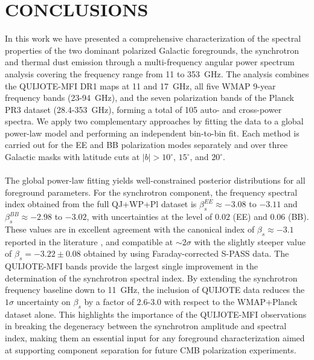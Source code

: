 \section{CONCLUSIONS}
\label{sec:conclusions}

In this work we have presented a comprehensive characterization of the spectral properties of the two dominant polarized Galactic foregrounds, the synchrotron and thermal dust emission through a multi-frequency angular power spectrum analysis covering the frequency range from 11 to 353~GHz. The analysis combines the QUIJOTE-MFI DR1 maps at 11 and 17~GHz, all five WMAP 9-year frequency bands (23-94~GHz), and the seven polarization bands of the Planck PR3 dataset (28.4-353~GHz), forming a total of 105 auto- and cross-power spectra. We apply two complementary approaches by fitting the data to a global power-law model and performing an independent bin-to-bin fit. Each method is carried out for the EE and BB polarization modes separately and over three Galactic masks with latitude cuts at $|b| > 10^\circ$, $15^\circ$, and $20^\circ$.

\paragraph{}

The global power-law fitting yields well-constrained posterior distributions for all foreground parameters. For the synchrotron component, the frequency spectral index obtained from the full QJ+WP+Pl dataset is $\beta_s^{EE} \approx -3.08$ to $-3.11$ and $\beta_s^{BB} \approx -2.98$ to $-3.02$, with uncertainties at the level of $0.02$ (EE) and $0.06$ (BB). These values are in excellent agreement with the canonical index of $\beta_s \approx -3.1$ reported in the literature \citep{Fuskeland_2014, Martire_2022}, and compatible at $\sim 2\sigma$ with the slightly steeper value of $\beta_s = -3.22 \pm 0.08$ obtained by \citet{Fuskeland_2021} using Faraday-corrected S-PASS data. The QUIJOTE-MFI bands provide the largest single improvement in the determination of the synchrotron spectral index. By extending the synchrotron frequency baseline down to 11~GHz, the inclusion of QUIJOTE data reduces the $1\sigma$ uncertainty on $\beta_s$ by a factor of $2.6$-$3.0$ with respect to the WMAP+Planck dataset alone. This highlights the importance of the QUIJOTE-MFI observations in breaking the degeneracy between the synchrotron amplitude and spectral index, making them an essential input for any foreground characterization aimed at supporting component separation for future CMB polarization experiments.

